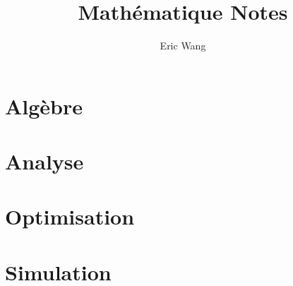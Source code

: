 \documentclass{book}
\begin{document}
\title{Math\'ematique Notes}
\author{Eric Wang}
\maketitle
\newpage
\tableofcontents
\newpage

\part{Alg\`ebre}









\part{Analyse}

\part{Optimisation}



\part{Simulation}

\end{document}
